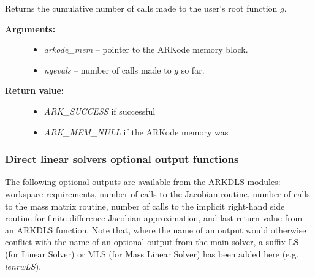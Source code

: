 \documentclass[letterpaper,10pt,english]{sphinxmanual}
\begin{document}
\begin{fulllineitems}
\label{c_interface/User_callable:ARKodeGetNumGEvals}
Returns the cumulative number of calls made to the
user's root function $g$.
\begin{description}
\item[{\textbf{Arguments:}}] \leavevmode\begin{itemize}
\item {} 
\emph{arkode\_mem} -- pointer to the ARKode memory block.

\item {} 
\emph{ngevals} -- number of calls made to $g$ so far.

\end{itemize}

\item[{\textbf{Return value:}}] \leavevmode\begin{itemize}
\item {} 
\emph{ARK\_SUCCESS} if successful

\item {} 
\emph{ARK\_MEM\_NULL} if the ARKode memory was 

\end{itemize}

\end{description}

\end{fulllineitems}



\subsubsection{Direct linear solvers optional output functions}
\label{c_interface/User_callable:cinterface-arkdlsoutputs}\label{c_interface/User_callable:direct-linear-solvers-optional-output-functions}
The following optional outputs are available from the ARKDLS
modules: workspace requirements, number of calls to the Jacobian
routine, number of calls to the mass matrix routine, number of calls
to the implicit right-hand side routine for finite-difference Jacobian
approximation, and last return value from an ARKDLS function.  Note
that, where the name of an output would otherwise conflict with the
name of an optional output from the main solver, a suffix LS (for
Linear Solver) or MLS (for Mass Linear Solver) has been added here
(e.g. \emph{lenrwLS}).
\end{document}

